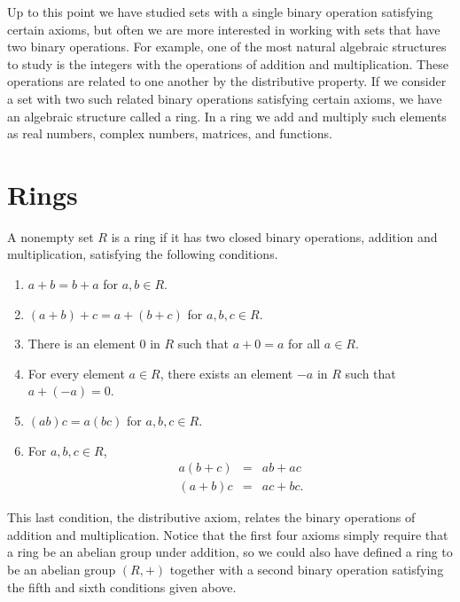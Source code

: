  
Up to this point we have studied sets with a single binary operation
satisfying certain axioms, but often we are more interested in working
with sets that have two binary operations.  For example, one of the
most natural algebraic structures to study is the integers 
with the operations of addition and multiplication. These operations
are related to one another by the distributive
property. If we consider a set with two such related binary operations
satisfying certain axioms, we have an algebraic structure called a
ring. In a ring we add and multiply such elements as real numbers,
complex numbers, matrices, and functions. 
 

\section{Rings}

A nonempty set $R$ is a {\bfi ring\/} if
it has two closed binary operations, addition and multiplication,
satisfying the following conditions.  
\begin{enumerate}
 
\item
$a + b = b + a$ for $a, b \in R$.
 
\item
$(a + b) + c = a + ( b + c)$ for $a, b, c  \in R$.
 
\item
There is an element $0$ in $R$ such that $a + 0 = a$ for all $a \in
R$. 
 
\item
For every element $a \in R$, there exists an element $-a$ in $R$ such
that $a + (-a) = 0$. 
 
\item
$(ab)  c = a  ( b  c)$ for $a, b, c  \in R$.
 
\item
For $a, b, c \in R$,
\begin{eqnarray*}
a( b + c)&  = & ab +ac \\
(a + b)c & = & ac + bc.
\end{eqnarray*}
 
\end{enumerate}
This last condition, the distributive axiom, relates the binary
operations of addition and multiplication. Notice that the first four
axioms simply require that a ring be an abelian group under addition,
so we could also have defined a ring to be an abelian group
$(R, +)$ together with a second binary operation satisfying the fifth
and sixth conditions given above.  
 
